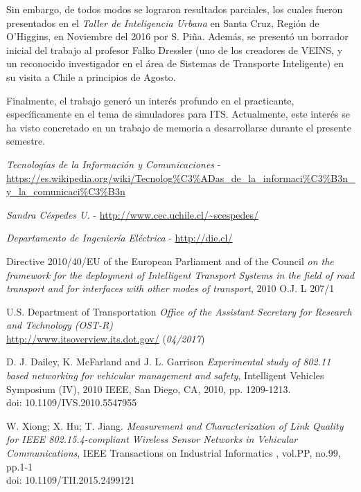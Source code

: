 \documentclass[11pt,letterpaper]{article}
\begin{document}
Sin embargo, de todos modos se lograron resultados parciales, los cuales fueron presentados en el \emph{Taller de Inteligencia Urbana} en Santa Cruz, Región de O'Higgins, en Noviembre del 2016 por S. Piña. Además, se presentó un borrador inicial del trabajo al profesor Falko Dressler (uno de los creadores de VEINS, y un reconocido investigador en el área de Sistemas de Transporte Inteligente) en su visita a Chile a principios de Agosto.

Finalmente, el trabajo generó un interés profundo en el practicante, específicamente en el tema de simuladores para ITS. Actualmente, este interés se ha visto concretado en un trabajo de memoria a desarrollarse durante el presente semestre.

\newpage
\begin{thebibliography}{5}
     \emph{Tecnologías de la Información y Comunicaciones} - \url{https://es.wikipedia.org/wiki/Tecnolog%C3%ADas_de_la_informaci%C3%B3n_y_la_comunicaci%C3%B3n}

     \emph{Sandra Céspedes U.} - \url{http://www.cec.uchile.cl/~scespedes/}

     \emph{Departamento de Ingeniería Eléctrica} - \url{http://die.cl/}

  		 Directive 2010/40/EU of the European Parliament and of the Council
  		\textit{on the framework for the deployment of Intelligent Transport Systems in the field of road transport and for interfaces with other modes of transport},
  		2010 O.J. L 207/1

  		 U.S. Department of Transportation
  		\textit{Office of the Assistant Secretary for Research and Technology (OST-R)}
  		\\\url{http://www.itsoverview.its.dot.gov/} (\textit{04/2017})

  		 D. J. Dailey, K. McFarland and J. L. Garrison
  		\textit{Experimental study of 802.11 based networking for vehicular management and safety},
  		Intelligent Vehicles Symposium (IV), 2010 IEEE, San Diego, CA, 2010, pp. 1209-1213.
  		\\doi: 10.1109/IVS.2010.5547955


  		 W. Xiong; X. Hu; T. Jiang.
  		\textit{Measurement and Characterization of Link Quality for IEEE 802.15.4-compliant Wireless Sensor Networks in Vehicular Communications},
  		IEEE Transactions on Industrial Informatics , vol.PP, no.99, pp.1-1
  		\\doi: 10.1109/TII.2015.2499121


\end{thebibliography}
\end{document}
